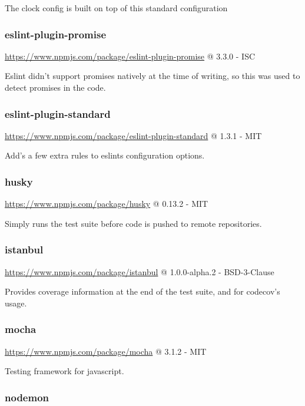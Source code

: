 The clock config is built on top of this standard configuration

\subsubsection*{eslint-plugin-promise} 

\url{https://www.npmjs.com/package/eslint-plugin-promise} @ 3.3.0 - ISC

Eslint didn't support promises natively at the time of writing, so this was used to detect promises in the code.

\subsubsection*{eslint-plugin-standard} 

\url{https://www.npmjs.com/package/eslint-plugin-standard} @ 1.3.1 - MIT

Add's a few extra rules to eslints configuration options.

\subsubsection*{husky} 

\url{https://www.npmjs.com/package/husky} @ 0.13.2 - MIT

Simply runs the test suite before code is pushed to remote repositories.

\subsubsection*{istanbul} 

\url{https://www.npmjs.com/package/istanbul} @ 1.0.0-alpha.2 - BSD-3-Clause

Provides coverage information at the end of the test suite, and for codecov's usage.

\subsubsection*{mocha} 

\url{https://www.npmjs.com/package/mocha} @ 3.1.2 - MIT

Testing framework for javascript.

\subsubsection*{nodemon} 

